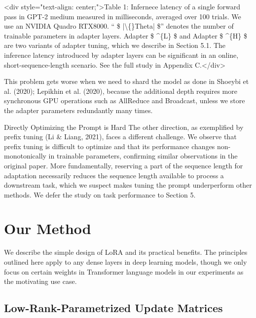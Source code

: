 \documentclass[conference]{IEEEtran}
\begin{document}
\textless{}div style="text-align: center;"\textgreater{}Table 1: Infernece latency of a single forward pass in GPT-2 medium measured in milliseconds, averaged over 100 trials. We use an NVIDIA Quadro RTX8000. “ \$ |\textbackslash\{\}Theta| \$” denotes the number of trainable parameters in adapter layers. Adapter \$ \textasciicircum{}\{L\} \$ and Adapter \$ \textasciicircum{}\{H\} \$ are two variants of adapter tuning, which we describe in Section 5.1. The inference latency introduced by adapter layers can be significant in an online, short-sequence-length scenario. See the full study in Appendix C.\textless{}/div\textgreater{}

This problem gets worse when we need to shard the model as done in Shoeybi et al. (2020); Lepikhin et al. (2020), because the additional depth requires more synchronous GPU operations such as AllReduce and Broadcast, unless we store the adapter parameters redundantly many times.

Directly Optimizing the Prompt is Hard The other direction, as exemplified by prefix tuning (Li \& Liang, 2021), faces a different challenge. We observe that prefix tuning is difficult to optimize and that its performance changes non-monotonically in trainable parameters, confirming similar observations in the original paper. More fundamentally, reserving a part of the sequence length for adaptation necessarily reduces the sequence length available to process a downstream task, which we suspect makes tuning the prompt underperform other methods. We defer the study on task performance to Section 5.




\section{Our Method}

We describe the simple design of LoRA and its practical benefits. The principles outlined here apply to any dense layers in deep learning models, though we only focus on certain weights in Transformer language models in our experiments as the motivating use case.




\subsection{Low-Rank-Parametrized Update Matrices}
\end{document}
